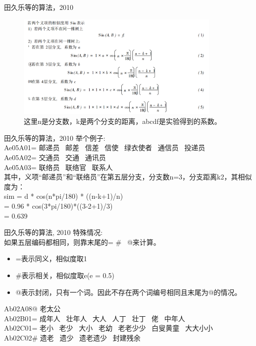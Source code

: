 \documentclass{beamer}
\begin{document}
    \begin{frame}{田久乐等的算法，2010}
    \begin{center}
      \begin{figure}
      \includegraphics[width=3.9in,height=2in]{cilin-method-2010.png}
      \caption{这里n是分支数，k是两个分支的距离，abcdf是实验得到的系数。}
      \end{figure}
      \end{center}
    \end{frame}

    \begin{frame}{田久乐等的算法，2010}
    举个例子: \\
    Ae05A01= 邮递员 \ 邮差 \ 信差 \ 信使 \ 绿衣使者 \ 通信员 \ 投递员 \\
    Ae05A02= 交通员 \ 交通 \ 通讯员 \\
    Ae05A03= 联络员 \ 联络官 \ 联系人 \\
    其中，义项“邮递员”和“联络员”在第五层分支，分支数n=3，分支距离k2，其相似度为：\\
    sim = d * cos(n*pi/180) * ((n-k+1)/n) \\
        = 0.96 * cos(3*pi/180)*((3-2+1)/3) \\
        = 0.639 \\

    \end{frame}

    \begin{frame}{田久乐等的算法, 2010}
    特殊情况: \\
    如果五层编码都相同，则靠末尾的= \# \ @来计算。\\
    \begin{itemize}
      \item =表示同义，相似度取1 \\
      \item \#表示相关，相似度取e(e = 0.5) \\
      \item @表示封闭，只有一个词。因此不存在两个词编号相同且末尾为@的情况。\\
    \end{itemize}

    Ab02A08@ 老太公 \\
    Ab02B01= 成年人 \ 壮年人 \ 大人 \ 人丁 \ 壮丁 \ 佬 \ 中年人 \\
    Ab02C01= 老小 \ 老少 \ 大小 \ 老幼 \ 老老少少 \ 白叟黄童 \ 大大小小 \\
    Ab02C02\# 遗老 \ 遗少 \ 遗老遗少 \ 封建残余 \\
    \end{frame}
\end{document}
